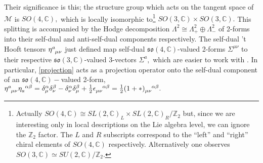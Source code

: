 \documentclass[a4paper,12pt, onecolumn, notitlepage]{article}
\theoremstyle{definition}
\theoremstyle{remark}
\newcommand{\al}{\alpha}
\newcommand{\m}{\mu}
\newcommand{\n}{\nu}
\newcommand{\e}{\epsilon}
\newcommand{\hooft}[3]{\eta\indices{^{#1}_{#2}_{#3}}}
\newcommand{\ihooft}[3]{\eta\indices{_{#1}^{#2}^{#3}}}
\begin{document}
Their significance is this; the structure group which acts on the tangent space of $\mathcal{M}$ is $SO(4,\mathbb{C}),$ which is locally isomorphic to\footnote{Actually $SO(4,\mathbb{C}) \cong SL(2,\mathbb{C})_{L}\times SL(2,\mathbb{C})_{R}/\mathbb{Z}_{2}$ but, since we are interesting only in local descriptions on the Lie algebra level, we can ignore the $\mathbb{Z}_{2}$ factor. The $L$ and $R$ subscripts correspond to the ``left'' and ``right'' chiral elements of $SO(4,\mathbb{C})$ respectively. Alternatively one observes $SO(3,\mathbb{C})\simeq SU(2,\mathbb{C})/\mathbb{Z}_{2}.$} $SO(3,\mathbb{C})\times SO(3,\mathbb{C}).$ This splitting is accompanied by the Hodge decomposition $\Lambda^{2}\cong\Lambda_{+}^{2}\oplus\Lambda^{2}_{-}$ of 2-forms into their self-dual and anti-self-dual components respectively. The self-dual 't Hooft tensors $\hooft{a}{\m}{\n}$ just defined map self-dual $\mathfrak{so}(4,\mathbb{C})$-valued 2-forms $\Sigma^{\m\n}$ to their respective $\mathfrak{so}(3,\mathbb{C})$-valued 3-vectors $\Sigma^{a},$ which are easier to work with \cite{hooft_1976}. In particular, \cref{projection} acts as a projection operator onto the self-dual component of an $\mathfrak{so}(4,\mathbb{C})-$valued 2-form, $\hooft{a}{\m}{\n}\ihooft{a}{\al}{\beta} = \delta^{\al}_{\m}\delta^{\beta}_{\n} - \delta^{\al}_{\n}\delta^{\beta}_{\m} +\frac{1}{2}\e\indices{_\m_\n^\al^\beta} = \frac{1}{2}(1+\ast)\indices{_\m_\n^\al^\beta}.$\\
\end{document}
